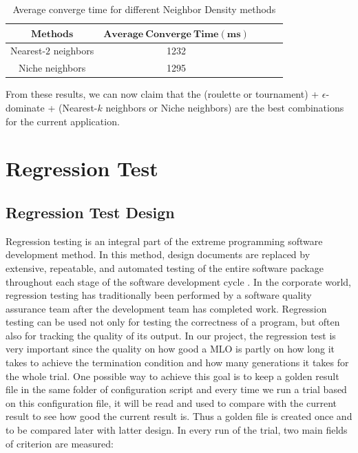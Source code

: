 \documentclass[12pt, runningheads,a4paper]{llncs}
\begin{document}
\begin{table}
\caption {Average converge time for different Neighbor Density methods}  
 \label{tab:compare3}
 \begin{center}
\begin{tabular}{c|cccc} 
\toprule 
	$\mathbf{Methods}$   & $\mathbf{Average\ Converge\ Time (ms)}$\\
	\hline Nearest-$2$ neighbors &  1232 \\ 
         Niche neighbors & 1295 \\
\bottomrule 
\end{tabular} 
\end{center}
\end{table}

From these results, we can now claim that the (roulette or tournament) + $\epsilon$-dominate  + (Nearest-$k$ neighbors or Niche neighbors) are the best combinations for the current application.

\section{Regression Test}
\subsection{Regression Test Design}
Regression testing is an integral part of the extreme programming software development method. In this method, design documents are replaced by extensive, repeatable, and automated testing of the entire software package throughout each stage of the software development cycle \cite{regression}. In the corporate world, regression testing has traditionally been performed by a software quality assurance team after the development team has completed work.
Regression testing can be used not only for testing the correctness of a program, but often also for tracking the quality of its output. In our project, the regression test is very important since the quality on how good a MLO is partly on how long it takes to achieve the termination condition and how many generations it takes for the whole trial. One possible way to achieve this goal is to keep a golden result file in the same folder of configuration script and every time we run a trial based on this configuration file, it will be read and used to compare with the current result to see how good the current result is. Thus a golden file is created once and to be compared later with latter design. In every run of the trial, two main fields of criterion are measured:
\end{document}

